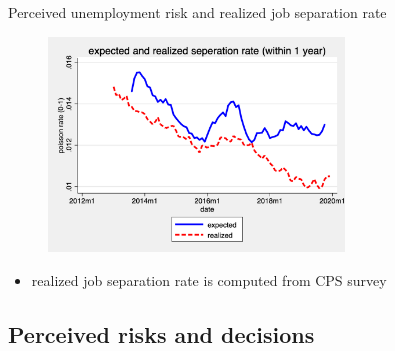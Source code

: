 \documentclass{beamer}
\begin{document}
\begin{frame}{Perceived unemployment risk and realized job separation rate}
	\begin{figure}
		\centering
		\label{ue_expectations}
		\includegraphics[width=0.7\textwidth]{figures/seperation_rate_1y}
	\end{figure}
	\begin{itemize}
	\item realized job separation rate is computed from CPS survey 
	\end{itemize}
\end{frame}




\subsection{Perceived risks and decisions}
\end{document}

